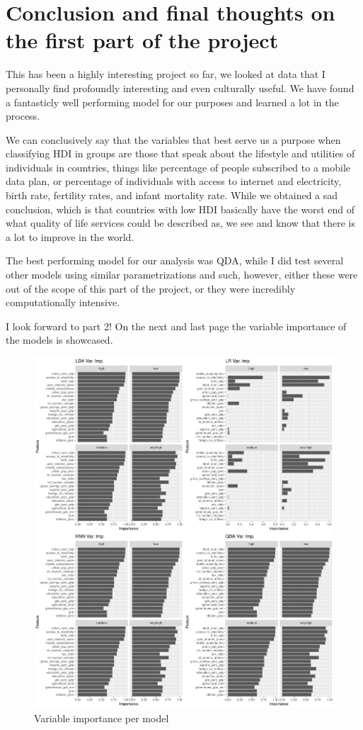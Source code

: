 \documentclass[]{article}
\begin{document}
\hypertarget{conclusion-and-final-thoughts-on-the-first-part-of-the-project}{%
\section{Conclusion and final thoughts on the first part of the
project}\label{conclusion-and-final-thoughts-on-the-first-part-of-the-project}}

This has been a highly interesting project so far, we looked at data
that I personally find profoundly interesting and even culturally
useful. We have found a fantasticly well performing model for our
purposes and learned a lot in the process.

We can conclusively say that the variables that best serve us a purpose
when classifying HDI in groups are those that speak about the lifestyle
and utilities of individuals in countries, things like percentage of
people subscribed to a mobile data plan, or percentage of individuals
with access to internet and electricity, birth rate, fertility rates,
and infant mortality rate. While we obtained a sad conclusion, which is
that countries with low HDI basically have the worst end of what quality
of life services could be described as, we see and know that there is a
lot to improve in the world.

The best performing model for our analysis was QDA, while I did test
several other models using similar parametrizations and such, however,
either these were out of the scope of this part of the project, or they
were incredibly computationally intensive.

I look forward to part 2! On the next and last page the variable
importance of the models is showcased.

\newpage

\begin{figure}
\centering
\includegraphics{./img/variable_importance_models.png}
\caption{Variable importance per model}
\end{figure}
\end{document}

